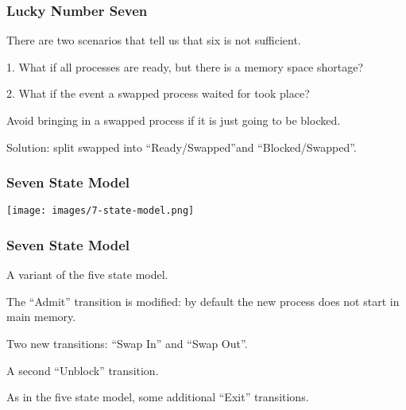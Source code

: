 \begin{frame}
	\frametitle{Lucky Number Seven}

	There are two scenarios that tell us that six is not sufficient.

	1. What if all processes are ready, but there is a memory space shortage?

	2. What if the event a swapped process waited for took place?

	Avoid bringing in a swapped process if it is just going to be blocked.

	Solution: split swapped into ``Ready/Swapped''and ``Blocked/Swapped''.

\end{frame}

\begin{frame}
	\frametitle{Seven State Model}

	\begin{center}
		\texttt{[image: images/7-state-model.png]}
	\end{center}

\end{frame}

\begin{frame}
	\frametitle{Seven State Model}
	A variant of the five state model.

	The ``Admit'' transition is modified: by default the new process does not start in main memory.

	Two new transitions: ``Swap In'' and ``Swap Out''.

	A second ``Unblock'' transition.

	As in the five state model, some additional ``Exit'' transitions.

\end{frame}



